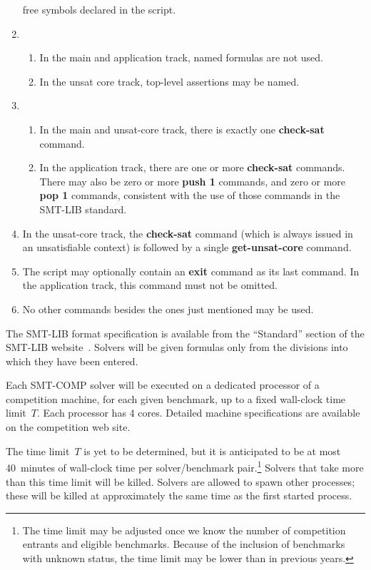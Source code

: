 \documentclass[12pt]{article}
\newcommand{\akey}[1]{\textbf{#1}}
\begin{document}
\begin{enumerate}
  free symbols declared in the script.
\item
  \begin{enumerate}
    \item In the main and application track, named formulas are not
      used.
    \item In the unsat core track, top-level assertions may be named.
  \end{enumerate}
\item
  \begin{enumerate}
  \item In the main and unsat-core track, there is exactly one
    \akey{check-sat} command.
  \item In the application track, there are one or more
    \akey{check-sat} commands.  There may also be zero or more
    \akey{push 1} commands, and zero or more \akey{pop 1} commands,
    consistent with the use of those commands in the SMT-LIB standard.
  \end{enumerate}
\item In the unsat-core track, the \akey{check-sat} command (which is
  always issued in an unsatisfiable context) is followed by a single
  \akey{get-unsat-core} command.
\item The script may optionally contain an \akey{exit} command as its
  last command.  In the application track, this command must not be
  omitted.
\item No other commands besides the ones just mentioned may be used.
\end{enumerate}
%
The SMT-LIB format specification is available from the ``Standard''
section of the SMT-LIB website~\cite{SMT-LIB}.  Solvers will be given
formulas only from the divisions into which they have been entered.

%
Each SMT-COMP solver will be executed on a dedicated processor of a
competition machine, for each given benchmark, up to a fixed
wall-clock time limit~$T$.  Each processor has 4 cores.  Detailed
machine specifications are available on the competition web site.

The time limit~$T$ is yet to be determined, but it is anticipated to
be at most 40~minutes of wall-clock time per solver/benchmark
pair.\footnote{The time limit may be adjusted once we know the number
  of competition entrants and eligible benchmarks.  Because of the
  inclusion of benchmarks with unknown status, the time limit may be
  lower than in previous years.}  Solvers that take more than this
time limit will be killed.  Solvers are allowed to spawn other
processes; these will be killed at approximately the same time as the
first started process.
\end{document}

